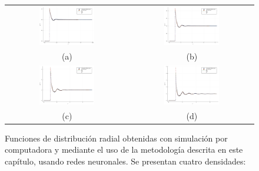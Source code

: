 \begin{figure}[p]
    \begin{tabular}{cc}
        \includegraphics[width=0.47\textwidth]{figuras/capitulo-3/p=0.15.pdf} & 
        \includegraphics[width=0.47\textwidth]{figuras/capitulo-3/p=0.25.pdf} \\
        (a) & (b) \\[6pt]
        \includegraphics[width=0.47\textwidth]{figuras/capitulo-3/p=0.35.pdf} &   \includegraphics[width=0.47\textwidth]{figuras/capitulo-3/p=0.45.pdf} \\
        (c) & (d) \\[6pt]
    \end{tabular}
    \captionsetup{singlelinecheck=off}
    \caption[Funciones de distribución radial con redes neuronales.]{Funciones de distribución radial obtenidas con simulación por computadora y mediante el uso de la metodología descrita en este capítulo, usando redes neuronales. Se presentan cuatro densidades: 
}
\end{figure}
